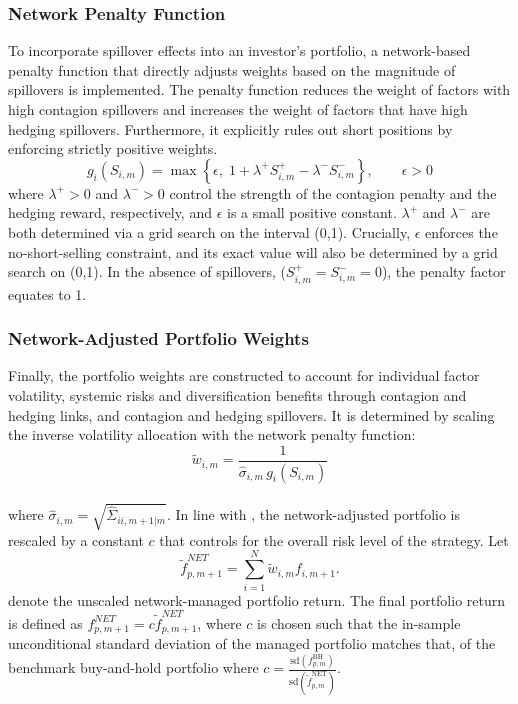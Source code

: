 \documentclass[11pt]{article}
\begin{document}
\subsubsection{Network Penalty Function}
To incorporate spillover effects into an investor's portfolio, a network-based penalty function that directly adjusts weights based on the magnitude of spillovers is implemented. The penalty function reduces the weight of factors with high contagion spillovers and increases the weight of factors that have high hedging spillovers. Furthermore, it explicitly rules out short positions by enforcing strictly positive weights. 
\begin{equation}
g_i(S_{i,m})=
\max\left\{\epsilon,\;1+\lambda^{+}S^{+}_{i,m}-\lambda^{-}S^{-}_{i,m}\right\},
\qquad \epsilon>0
\end{equation}
where $\lambda^{+} > 0$ and $\lambda^{-} > 0$ control the strength of the
contagion penalty and the hedging reward, respectively, and $\epsilon$ is a small positive constant. $\lambda^{+}$ and $\lambda^{-}$ are both determined via a grid search on the interval (0,1). Crucially, $\epsilon$ enforces the no-short-selling constraint, and its exact value will also be determined by a grid search on (0,1). In the absence of spillovers, ($S^{+}_{i,m} = S^{-}_{i,m} = 0$), the penalty factor equates to 1.

\subsubsection{Network-Adjusted Portfolio Weights}
Finally, the portfolio weights are constructed to account for individual factor volatility, systemic risks and diversification benefits through contagion and hedging links, and contagion and hedging spillovers. It is determined by scaling the inverse volatility allocation with the network penalty function:
\begin{equation}
\tilde{w}_{i,m} =
\frac{1}{\hat{\sigma}_{i,m} \, g_i(S_{i,m})}
\end{equation} \\
where $\hat{\sigma}_{i,m} =\sqrt{\widehat\Sigma_{ii,m+1|m}}$. In line with \cite{moreira2017volatility}, the network-adjusted portfolio is rescaled by a constant $c$ that controls for the overall risk level of the strategy. Let
\begin{equation}
\tilde{f}^{NET}_{p,m+1} = \sum_{i=1}^{N} \tilde{w}_{i,m} f_{i,m+1}.
\end{equation}
denote the unscaled network-managed portfolio return. The final portfolio return is defined as $f^{NET}_{p,m+1} = c  \tilde{f}^{NET}_{p,m+1}$, where $c$ is chosen such that the in-sample unconditional standard deviation of the managed portfolio matches that, of the benchmark buy-and-hold portfolio where $c = \frac{\mathrm{sd}\!\left(f_{p,m}^{\mathrm{BH}}\right)}
{\mathrm{sd}\!\left(\tilde{f}_{p,m}^{\mathrm{NET}}\right)}$.
\end{document}
